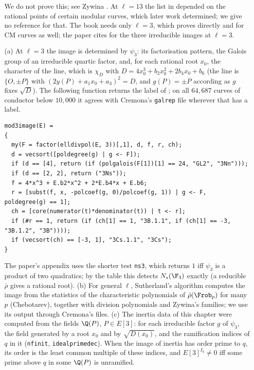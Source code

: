 We do not prove this; see Zywina \cite[Section 1]{Zywina15}. At $\ell=13$ the list in \cite{Zywina15} depended on the rational points of certain modular
curves, which later work determined; we give no reference for that. The book needs only $\ell=3$, which  proves directly
and for CM curves as well; the paper cites \cite{Zywina15} for the three irreducible images at $\ell=3$.

\begin{remark}\label{rem:galrep:computing-images}
(a) At $\ell=3$ the image is determined by $\psi_3$: its factorisation pattern, the Galois group of an irreducible quartic factor, and, for each
rational root $x_0$, the character of the line, which is $\chi_D$ with $D=4x_0^3+b_2x_0^2+2b_4x_0+b_6$ (the line is $\{O,\pm P\}$ with
$(2y(P)+a_1x_0+a_3)^2=D$, and $g(P)=\pm P$ according as $g$ fixes $\sqrt D$). The following function returns the label of ; on
all $64{,}687$ curves of conductor below $10{,}000$ it agrees with Cremona's \texttt{galrep} file wherever that has a label.
\begin{lstlisting}[language=GP]
mod3image(E) =
{
  my(F = factor(elldivpol(E, 3))[,1], d, f, r, ch);
  d = vecsort([poldegree(g) | g <- F]);
  if (d == [4], return (if (polgalois(F[1])[1] == 24, "GL2", "3Nn")));
  if (d == [2, 2], return ("3Ns"));
  f = 4*x^3 + E.b2*x^2 + 2*E.b4*x + E.b6;
  r = [subst(f, x, -polcoef(g, 0)/polcoef(g, 1)) | g <- F, poldegree(g) == 1];
  ch = [core(numerator(t)*denominator(t)) | t <- r];
  if (#r == 1, return (if (ch[1] == 1, "3B.1.1", if (ch[1] == -3, "3B.1.2", "3B"))));
  if (vecsort(ch) == [-3, 1], "3Cs.1.1", "3Cs");
}
\end{lstlisting}
The paper's appendix uses the shorter test \texttt{ns3}, which returns $1$ iff $\psi_3$ is a product of two quadratics; by the table this detects
$N_s(\F_3)$ exactly (a reducible $\bar\rho$ gives a rational root). (b) For general $\ell$, Sutherland's algorithm \cite{Sutherland16} computes the
image from the statistics of the characteristic polynomials of $\bar\rho(\Frob_p)$ for many $p$ (Chebotarev), together with division polynomials and
Zywina's families; we use its output through Cremona's files. (c) The inertia data of this chapter were computed from the fields $\Q(P)$, $P\in E[3]$:
for each irreducible factor $g$ of $\psi_3$, the field generated by a root $x_0$ and by $\sqrt{D(x_0)}$, and the ramification indices of $q$ in it
(\texttt{nfinit}, \texttt{idealprimedec}). When the image of inertia has order prime to $q$, its order is the least common multiple of these
indices, and $E[3]^{I_q}\ne0$ iff some prime above $q$ in some $\Q(P)$ is unramified.
\end{remark}

